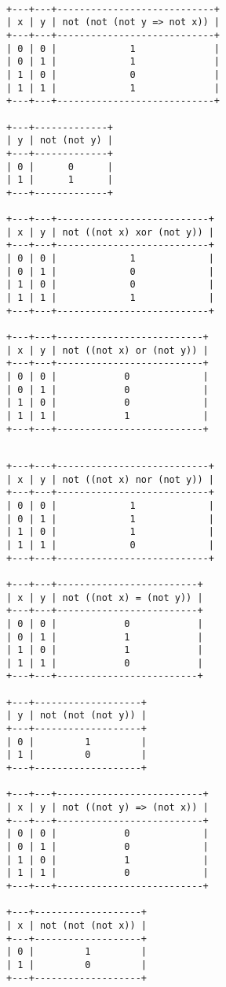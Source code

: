 \documentclass{article}
\begin{document}
\newpage

\begin{verbatim}

+---+---+----------------------------+
| x | y | not (not (not y => not x)) |
+---+---+----------------------------+
| 0 | 0 |             1              |
| 0 | 1 |             1              |
| 1 | 0 |             0              |
| 1 | 1 |             1              |
+---+---+----------------------------+

+---+-------------+
| y | not (not y) |
+---+-------------+
| 0 |      0      |
| 1 |      1      |
+---+-------------+

+---+---+---------------------------+
| x | y | not ((not x) xor (not y)) |
+---+---+---------------------------+
| 0 | 0 |             1             |
| 0 | 1 |             0             |
| 1 | 0 |             0             |
| 1 | 1 |             1             |
+---+---+---------------------------+

+---+---+--------------------------+
| x | y | not ((not x) or (not y)) |
+---+---+--------------------------+
| 0 | 0 |            0             |
| 0 | 1 |            0             |
| 1 | 0 |            0             |
| 1 | 1 |            1             |
+---+---+--------------------------+

\end{verbatim}

\newpage

\begin{verbatim}

+---+---+---------------------------+
| x | y | not ((not x) nor (not y)) |
+---+---+---------------------------+
| 0 | 0 |             1             |
| 0 | 1 |             1             |
| 1 | 0 |             1             |
| 1 | 1 |             0             |
+---+---+---------------------------+

+---+---+-------------------------+
| x | y | not ((not x) = (not y)) |
+---+---+-------------------------+
| 0 | 0 |            0            |
| 0 | 1 |            1            |
| 1 | 0 |            1            |
| 1 | 1 |            0            |
+---+---+-------------------------+

+---+-------------------+
| y | not (not (not y)) |
+---+-------------------+
| 0 |         1         |
| 1 |         0         |
+---+-------------------+

+---+---+--------------------------+
| x | y | not ((not y) => (not x)) |
+---+---+--------------------------+
| 0 | 0 |            0             |
| 0 | 1 |            0             |
| 1 | 0 |            1             |
| 1 | 1 |            0             |
+---+---+--------------------------+

+---+-------------------+
| x | not (not (not x)) |
+---+-------------------+
| 0 |         1         |
| 1 |         0         |
+---+-------------------+

\end{verbatim}
\end{document}
